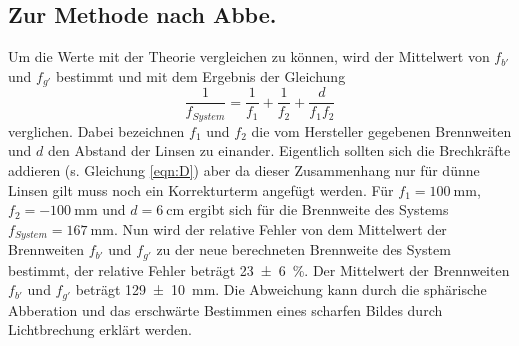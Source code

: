 \subsection{Zur Methode nach Abbe.}
Um die Werte mit der Theorie vergleichen zu können, wird der Mittelwert
von $f_{b'}$ und $f_{g'}$ bestimmt und mit dem Ergebnis der Gleichung
\begin{equation*}
  \frac{1}{f_{System}} = \frac{1}{f_{1}} + \frac{1}{f_{2}} + \frac{d}{f_{1} f_{2}}
\end{equation*}
verglichen. Dabei bezeichnen $f_1$ und $f_2$ die vom Hersteller gegebenen
Brennweiten und $d$ den Abstand der Linsen zu einander. Eigentlich
sollten sich die Brechkräfte addieren (s. Gleichung \eqref{eqn:D}) aber
da dieser Zusammenhang nur für dünne Linsen gilt muss noch ein Korrekturterm
angefügt werden.
Für $f_1 = \SI{100}{\milli\meter}$, $f_2 = \SI{-100}{\milli\meter}$ und
$d = \SI{6}{\centi\meter}$ ergibt sich für die Brennweite des
Systems $f_{System} =\SI{167}{\milli\meter}$. Nun wird der relative
Fehler von dem Mittelwert der Brennweiten $f_{b'}$ und $f_{g'}$ zu der
neue berechneten Brennweite des System bestimmt, der relative Fehler beträgt
\SI{23(6)}{\percent}. Der Mittelwert der Brennweiten $f_{b'}$ und $f_{g'}$
beträgt \SI{129(10)}{\milli\meter}. Die Abweichung kann durch die sphärische
Abberation und das erschwärte Bestimmen eines scharfen Bildes durch Lichtbrechung
erklärt werden.
